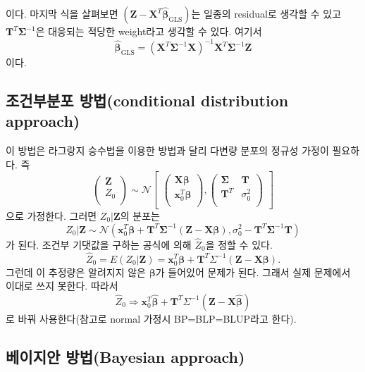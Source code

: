 \documentclass[b5paper,]{book}
\theoremstyle{definition}
\theoremstyle{definition}
\theoremstyle{definition}
\theoremstyle{remark}
\begin{document}
이다. 마지막 식을 살펴보면
\((\mathbf{Z}-\mathbf{X}^{T}\hat{\boldsymbol{\beta}}_{\text{GLS}})\)는
일종의 residual로 생각할 수 있고
\(\mathbf{T}^{T}\boldsymbol{\Sigma}^{-1}\)은 대응되는 적당한 weight라고
생각할 수 있다. 여기서
\[\hat{\boldsymbol{\beta}}_{\text{GLS}}=(\mathbf{X}^{T}\boldsymbol{\Sigma}^{-1}\mathbf{X})^{-1}\mathbf{X}^{T}\boldsymbol{\Sigma}^{-1}\mathbf{Z}\]
이다.

\subsection{조건부분포 방법(conditional distribution
approach)}\label{-conditional-distribution-approach}

이 방법은 라그랑지 승수법을 이용한 방법과 달리 다변량 분포의 정규성
가정이 필요하다. 즉 \[
\begin{pmatrix}
\mathbf{Z}\\
Z_{0}\\
\end{pmatrix}
\sim \mathcal{N}
\begin{bmatrix}
\begin{pmatrix}
\mathbf{X}\boldsymbol{\beta}\\
\mathbf{x}_{0}^{T}\boldsymbol{\beta}\\
\end{pmatrix},
\begin{pmatrix}
\boldsymbol{\Sigma} & \mathbf{T}\\
\mathbf{T}^{T} & \sigma_{0}^{2}\\
\end{pmatrix}
\end{bmatrix}
\] 으로 가정한다. 그러면 \(Z_{0}|\mathbf{Z}\)의 분포는
\[Z_{0}|\mathbf{Z} \sim \mathcal{N}(\mathbf{x}_{0}^{T}\boldsymbol{\beta}+\mathbf{T}^{T}\boldsymbol{\Sigma}^{-1}(\mathbf{Z}-\mathbf{X}\boldsymbol{\beta}), \sigma_{0}^{2}-\mathbf{T}^{T}\boldsymbol{\Sigma}^{-1}\mathbf{T})\]
가 된다. 조건부 기댓값을 구하는 공식에 의해 \(\hat{Z}_{0}\)을 정할 수
있다.
\[\hat{Z}_{0}=E(Z_{0}|\mathbf{Z})=\mathbf{x}_{0}^{T}\boldsymbol{\beta}+\mathbf{T}^{T}\Sigma^{-1}(\mathbf{Z}-\mathbf{X}\boldsymbol{\beta}).\]
그런데 이 추정량은 알려지지 않은 \(\boldsymbol{\beta}\)가 들어있어
문제가 된다. 그래서 실제 문제에서 이대로 쓰지 못한다. 따라서
\[\hat{Z}_{0}\Longrightarrow \mathbf{x}_{0}^{T}\hat{\boldsymbol{\beta}}+\mathbf{T}^{T}\Sigma^{-1}(\mathbf{Z}-\mathbf{X}\hat{\boldsymbol{\beta}})\]
로 바꿔 사용한다(참고로 normal 가정시 BP=BLP=BLUP라고 한다).

\subsection{베이지안 방법(Bayesian approach)}\label{-bayesian-approach}
\end{document}
